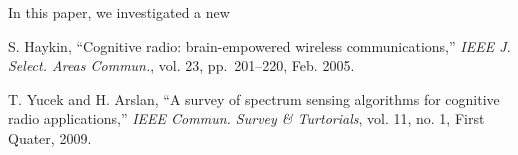 \documentclass[conference]{IEEEtran}
\begin{document}
In this paper, we investigated a new 


\balance
\begin{thebibliography}{99}

 S. Haykin, ``Cognitive radio: brain-empowered wireless communications,'' \textit{IEEE J. Select. Areas Commun.}, vol. 23, pp.~201--220, Feb. 2005.

 T. Yucek and H. Arslan, ``A survey of spectrum sensing algorithms for
cognitive radio applications,'' {\it IEEE Commun. Survey \&
Turtorials}, vol. 11, no. 1, First Quater, 2009.




\end{thebibliography}







\end{document}
